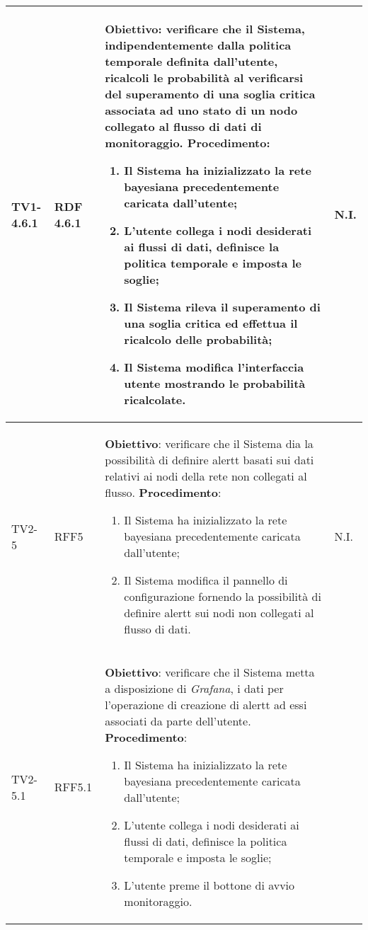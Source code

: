 \begin{longtable}{|C{.15\textwidth}|C{.13\textwidth}|m{.52\textwidth}|C{.08\textwidth}|}
\hline
TV1-4.6.1 & RDF 4.6.1 &
	\textbf{Obiettivo}: verificare che il Sistema, indipendentemente dalla politica temporale definita dall'utente, ricalcoli le probabilità al verificarsi del superamento di una soglia critica associata ad uno stato di un nodo collegato al flusso di dati di monitoraggio. \newline
	\textbf{Procedimento}:
	\begin{enumerate}
		\item Il Sistema ha inizializzato la rete bayesiana precedentemente caricata dall'utente;
		\item L'utente collega i nodi desiderati ai flussi di dati, definisce la politica temporale e imposta le soglie;
		\item Il Sistema rileva il superamento di una soglia critica ed effettua il ricalcolo delle probabilità;
		\item Il Sistema modifica l'interfaccia utente mostrando le probabilità ricalcolate.
	\end{enumerate}
	& N.I. \\
\hline
{}TV2-5 & RFF5 &
	\textbf{Obiettivo}: verificare che il Sistema dia la possibilità di definire alertt basati sui dati relativi ai nodi della rete non collegati al flusso. \newline
	\textbf{Procedimento}:
	\begin{enumerate}
		\item Il Sistema ha inizializzato la rete bayesiana precedentemente caricata dall'utente;
		\item Il Sistema modifica il pannello di configurazione fornendo la possibilità di definire alertt sui nodi non collegati al flusso di dati.
	\end{enumerate}
	& N.I. \\
\hline
TV2-5.1 & RFF5.1 &
	\textbf{Obiettivo}: verificare che il Sistema metta a disposizione di \textit{Grafana}, i dati per l'operazione di creazione di alertt ad essi associati da parte dell'utente. \newline
	\textbf{Procedimento}:
	\begin{enumerate}
		\item Il Sistema ha inizializzato la rete bayesiana precedentemente caricata dall'utente;
		\item L'utente collega i nodi desiderati ai flussi di dati, definisce la politica temporale e imposta le soglie;
		\item L'utente preme il bottone di avvio monitoraggio.
	\end{enumerate}

\end{longtable}
